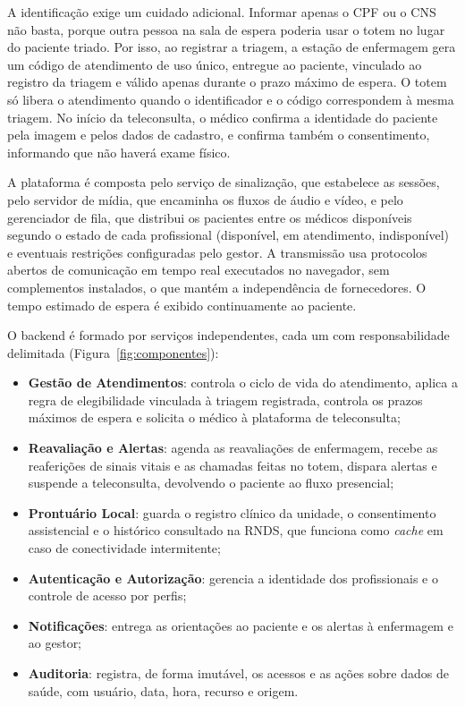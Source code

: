 A identificação exige um cuidado adicional. Informar apenas o CPF ou o CNS não basta, porque outra pessoa na sala de espera poderia usar o totem no lugar do paciente triado. Por isso, ao registrar a triagem, a estação de enfermagem gera um código de atendimento de uso único, entregue ao paciente, vinculado ao registro da triagem e válido apenas durante o prazo máximo de espera. O totem só libera o atendimento quando o identificador e o código correspondem à mesma triagem. No início da teleconsulta, o médico confirma a identidade do paciente pela imagem e pelos dados de cadastro, e confirma também o consentimento, informando que não haverá exame físico.


A plataforma é composta pelo serviço de sinalização, que estabelece as sessões, pelo servidor de mídia, que encaminha os fluxos de áudio e vídeo, e pelo gerenciador de fila, que distribui os pacientes entre os médicos disponíveis segundo o estado de cada profissional (disponível, em atendimento, indisponível) e eventuais restrições configuradas pelo gestor. A transmissão usa protocolos abertos de comunicação em tempo real executados no navegador, sem complementos instalados, o que mantém a independência de fornecedores. O tempo estimado de espera é exibido continuamente ao paciente.


O backend é formado por serviços independentes, cada um com responsabilidade delimitada (Figura~\ref{fig:componentes}):
\begin{itemize}
    \item \textbf{Gestão de Atendimentos}: controla o ciclo de vida do atendimento, aplica a regra de elegibilidade vinculada à triagem registrada, controla os prazos máximos de espera e solicita o médico à plataforma de teleconsulta;
    \item \textbf{Reavaliação e Alertas}: agenda as reavaliações de enfermagem, recebe as reaferições de sinais vitais e as chamadas feitas no totem, dispara alertas e suspende a teleconsulta, devolvendo o paciente ao fluxo presencial;
    \item \textbf{Prontuário Local}: guarda o registro clínico da unidade, o consentimento assistencial e o histórico consultado na RNDS, que funciona como \textit{cache} em caso de conectividade intermitente;
    \item \textbf{Autenticação e Autorização}: gerencia a identidade dos profissionais e o controle de acesso por perfis;
    \item \textbf{Notificações}: entrega as orientações ao paciente e os alertas à enfermagem e ao gestor;
    \item \textbf{Auditoria}: registra, de forma imutável, os acessos e as ações sobre dados de saúde, com usuário, data, hora, recurso e origem.
\end{itemize}

